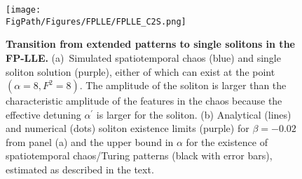 \begin{figure}[htpb]
	\begin{center}
		\texttt{[image: \\FigPath/Figures/FPLLE/FPLLE\_C2S.png]}
	\end{center}
	\caption[Transition from extended patterns to single solitons in the FP-LLE]{\textbf{Transition from extended patterns to single solitons in the FP-LLE.} (a)~Simulated spatiotemporal chaos (blue) and single soliton solution (purple), either of which can exist at the point $(\alpha=8,F^2=8)$. The amplitude of the soliton is larger than the characteristic amplitude of the features in the chaos because the effective detuning $\alpha^\prime$ is larger for the soliton. (b) Analytical (lines) and numerical (dots) soliton existence limits (purple) for $\beta=-0.02$ from panel (a) and the upper bound in $\alpha$ for the existence of spatiotemporal chaos/Turing patterns (black with error bars), estimated as described in the text. }
	\label{fig:FPLLE_C2S}
\end{figure} 

